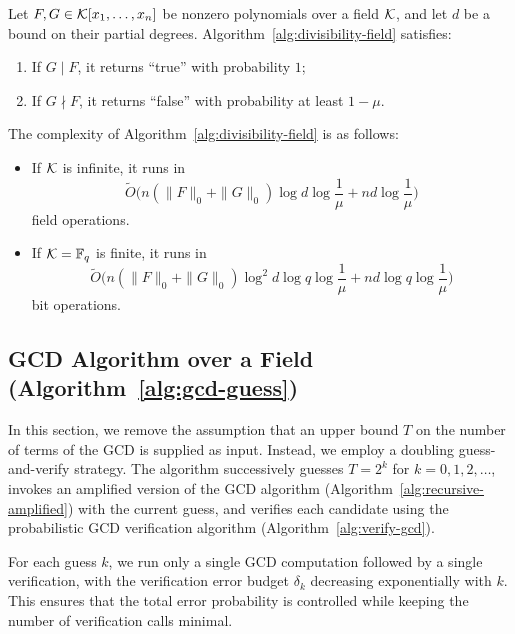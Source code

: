 \documentclass{article}
\numberwithin{equation}{section}
\begin{document}
\begin{lemma}\label{lem:divisibility-field}
Let $F, G \in {\mathcal{K}}[x_1,\dots,x_n]$ be nonzero polynomials over a field ${\mathcal{K}}$, and let $d$ be a bound on their partial degrees. Algorithm~\ref{alg:divisibility-field} satisfies:
\begin{enumerate}
    \item If $G \mid F$, it returns ``true'' with probability $1$;
    \item If $G \nmid F$, it returns ``false'' with probability at least $1-\mu$.
\end{enumerate}
The complexity of Algorithm~\ref{alg:divisibility-field} is as follows:
\begin{itemize}
    \item If ${\mathcal{K}}$ is infinite, it runs in
    \[
    \widetilde{O}\bigl( n(\|F\|_0+\|G\|_0)\log d \log\frac{1}{\mu} + nd \log\frac{1}{\mu} \bigr)
    \]
    field operations.
    \item If ${\mathcal{K}} = \mathbb{F}_q$ is finite, it runs in
    \[
    \widetilde{O}\bigl( n(\|F\|_0+\|G\|_0)\log^2 d \log q \log\frac{1}{\mu} + nd \log q \log\frac{1}{\mu} \bigr)
    \]
    bit operations.
\end{itemize}
\end{lemma}



\subsection{GCD Algorithm over a Field (Algorithm~\ref{alg:gcd-guess})}
\label{sec:field-no-t}

In this section, we remove the assumption that an upper bound $T$ on the number of terms of the GCD is supplied as input. Instead, we employ a doubling guess-and-verify strategy. The algorithm successively guesses $T = 2^k$ for $k = 0,1,2,\dots$, invokes an amplified version of the GCD algorithm (Algorithm~\ref{alg:recursive-amplified}) with the current guess, and verifies each candidate using the probabilistic GCD verification algorithm (Algorithm~\ref{alg:verify-gcd}). 

For each guess $k$, we run only a single GCD computation followed by a single verification, with the verification error budget $\delta_k$ decreasing exponentially with $k$. This ensures that the total error probability is controlled while keeping the number of verification calls minimal.
\end{document}
